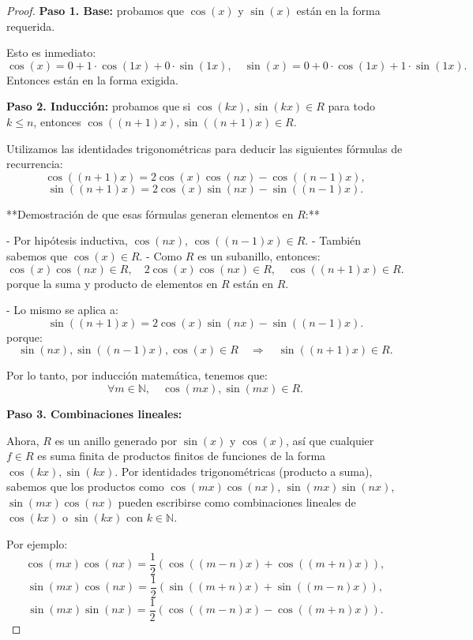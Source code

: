 \begin{ejemplo}
{\begin{enumerate}
\begin{proof}
			\medskip
			\textbf{Paso 1. Base: } probamos que \( \cos(x) \) y \( \sin(x) \) están en la forma requerida.
			
			Esto es inmediato:
			\[
			\cos(x) = 0 + 1 \cdot \cos(1x) + 0 \cdot \sin(1x), \quad
			\sin(x) = 0 + 0 \cdot \cos(1x) + 1 \cdot \sin(1x).
			\]
			Entonces están en la forma exigida.
			
			\medskip
			\textbf{Paso 2. Inducción:} probamos que si \( \cos(kx), \sin(kx) \in R \) para todo \( k \leq n \), entonces \( \cos((n+1)x), \sin((n+1)x) \in R \).
			
			Utilizamos las identidades trigonométricas para deducir las siguientes fórmulas de recurrencia:
			\[
			\cos((n+1)x) = 2 \cos(x)\cos(nx) - \cos((n-1)x),
			\]
			\[
			\sin((n+1)x) = 2 \cos(x)\sin(nx) - \sin((n-1)x).
			\]
			
			**Demostración de que esas fórmulas generan elementos en \( R \):**
			
			- Por hipótesis inductiva, \( \cos(nx) \), \( \cos((n-1)x) \in R \).
			- También sabemos que \( \cos(x) \in R \).
			- Como \( R \) es un subanillo, entonces:
			\[
			\cos(x)\cos(nx) \in R, \quad 2\cos(x)\cos(nx) \in R, \quad \cos((n+1)x) \in R.
			\]
			porque la suma y producto de elementos en \( R \) están en \( R \).
			
			- Lo mismo se aplica a:
			\[
			\sin((n+1)x) = 2\cos(x)\sin(nx) - \sin((n-1)x).
			\]
			porque:
			\[
			\sin(nx), \sin((n-1)x), \cos(x) \in R \quad \Rightarrow \quad \sin((n+1)x) \in R.
			\]
			
			Por lo tanto, por inducción matemática, tenemos que:
			\[
			\forall m \in \mathbb{N}, \quad \cos(mx), \sin(mx) \in R.
			\]
			
			\medskip
			\textbf{Paso 3. Combinaciones lineales:}
			
			Ahora, \( R \) es un anillo generado por \( \sin(x) \) y \( \cos(x) \), así que cualquier \( f \in R \) es suma finita de productos finitos de funciones de la forma \( \cos(kx), \sin(kx) \). Por identidades trigonométricas (producto a suma), sabemos que los productos como \( \cos(mx)\cos(nx) \), \( \sin(mx)\sin(nx) \), \( \sin(mx)\cos(nx) \) pueden escribirse como combinaciones lineales de \( \cos(kx) \) o \( \sin(kx) \) con \( k \in \mathbb{N} \).
			
			Por ejemplo:
			\[
			\cos(mx)\cos(nx) = \frac{1}{2}\left( \cos((m-n)x) + \cos((m+n)x) \right),
			\]
			\[
			\sin(mx)\cos(nx) = \frac{1}{2} \left( \sin((m+n)x) + \sin((m-n)x) \right),
			\]
			\[
			\sin(mx)\sin(nx) = \frac{1}{2}\left( \cos((m-n)x) - \cos((m+n)x) \right).
			\]
			

\end{proof}
\end{enumerate}}
\end{ejemplo}
